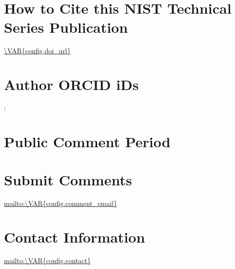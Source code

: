 \section*{How to Cite this NIST Technical Series Publication}

\par %
 \url{\VAR{config.doi_url}}
\par %

\section*{Author ORCID iDs}

: {}\\



\section*{Public Comment Period} %


\section*{Submit Comments}

\url{mailto:\VAR{config.comment_email}}


\section*{Contact Information}

\url{mailto:\VAR{config.contact}}



\normalsize{\bfseries{}}

	\tagstructend %

\hypersetup{bookmarksdepth=4}
